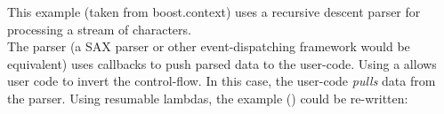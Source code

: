 \label{appendix}
This example (taken from boost.context\cite{bcontext}) uses a recursive descent
parser for processing a stream of characters.\\
The parser (a SAX parser or other event-dispatching framework would be
equivalent) uses callbacks to push parsed data to the user-code.
Using a \ectx allows user code to invert the control-flow. In this case, the
user-code \textit{pulls} data from the parser.
Using resumable lambdas, the example () could be re-written:
